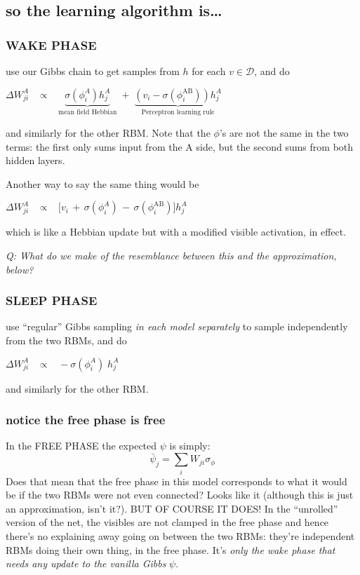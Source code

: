 \documentclass{article}
\begin{document}
    \subsection{so the learning algorithm
is\ldots{}}\label{so-the-learning-algorithm-is}

\subsubsection{WAKE PHASE}\label{wake-phase}

use our Gibbs chain to get samples from \(h\) for each
\(v \in \mathcal{D}\), and do

\(\Delta W_{ji}^A \;\;\; \propto \;\;\; \underbrace{\sigma(\phi^A_i) h_j^A}_\text{mean field Hebbian} \; + \; \underbrace{(v_i - \sigma(\phi_i^\text{AB})) h_j^A}_\text{Perceptron learning rule}\)

and similarly for the other RBM. Note that the \(\phi\)'s are not the
same in the two terms: the first only sums input from the A side, but
the second sums from both hidden layers.

Another way to say the same thing would be

\(\Delta W_{ji}^A \;\;\; \propto \;\;\; \big[ v_i \, + \, \sigma(\phi^A_i) \, - \,\sigma(\phi_i^\text{AB}) \big] h_j^A\)

which is like a Hebbian update but with a modified visible activation,
in effect.

\emph{Q: What do we make of the resemblance between this and the
approximation, below?}

\subsubsection{SLEEP PHASE}\label{sleep-phase}

use ``regular'' Gibbs sampling \emph{in each model separately} to sample
independently from the two RBMs, and do

\(\Delta W_{ji}^A \;\;\; \propto \;\;\; - \sigma( \phi^{A}_i) \; h_j^A\)

and similarly for the other RBM.

    \subsubsection{notice the free phase is
free}\label{notice-the-free-phase-is-free}

In the FREE PHASE the expected \(\psi\) is simply:
\[\bar{\psi}_j = \sum_i W_{ji} \sigma_{\phi}\] Does that mean that the
free phase in this model corresponds to what it would be if the two RBMs
were not even connected? Looks like it (although this is just an
approximation, isn't it?). BUT OF COURSE IT DOES! In the ``unrolled''
version of the net, the visibles are not clamped in the free phase and
hence there's no explaining away going on between the two RBMs: they're
independent RBMs doing their own thing, in the free phase. It's
\emph{only the wake phase that needs any update to the vanilla Gibbs}
\(\psi\).
\end{document}
